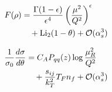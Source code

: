 \begin{align}
  F(\rho) &= \frac{\Gamma(1-\epsilon)}{\epsilon^{4}} \left(\frac{\mu^2}{Q^2}\right)^{\epsilon} \nonumber \\
  &\quad + \mathrm{Li}_{2}(1 - \theta) + \mathcal{O}(\alpha_s^3) \label{eq:2}
\end{align}

\begin{align}
  \frac{1}{\sigma_0} \frac{d\sigma}{d\theta} &= C_A P_{qq}(z) \log\frac{\mu_R^2}{Q^2} \nonumber \\
  &\quad + \frac{s_{ij}}{k_T^2} T_F n_f + \mathcal{O}(\alpha_s^3) \label{eq:3}
\end{align}

